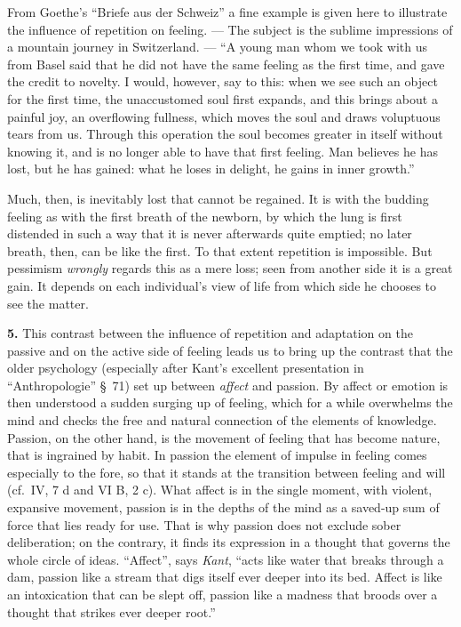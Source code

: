 \documentclass[12pt,a4paper]{book}
\newcommand{\opage}[1]{\marginnote{\footnotesize\textit{[#1]}}}
\begin{document}
From Goethe's ``Briefe aus der Schweiz'' a fine example is given here
to illustrate the influence of repetition on feeling. --- The subject is
the sublime impressions of a mountain journey in Switzerland. --- ``A
young man whom we took with us from Basel said that he did not have the
same feeling as the first time, and gave the credit to novelty. I would,
however, say to this: when we see such an object for the first time, the
unaccustomed soul first expands, and this brings about a painful joy, an
overflowing fullness, which moves the soul and draws voluptuous tears
from us. Through this operation the soul becomes greater in itself
without knowing it, and is no longer able to have that first feeling.
Man believes he has lost, but he has gained: what he loses in delight,
he gains in inner growth.''

Much, then, is inevitably lost that cannot be regained. It is with the
budding feeling as with the first breath of the newborn, by which the
lung is first distended in such a way that it is never afterwards quite
emptied; no later breath, then, can be like the first. To that extent
repetition is impossible. But pessimism \emph{wrongly} regards this as a
mere loss; seen from another side it is a great
\opage{334}gain. It depends on each individual's view of life from which
side he chooses to see the matter.

\textbf{5.} This contrast between the influence of repetition and
adaptation on the passive and on the active side of feeling leads us to
bring up the contrast that the older psychology (especially after
Kant's excellent presentation in ``Anthropologie'' \S~71) set up between
\emph{affect} and passion. By affect or emotion is then understood a
sudden surging up of feeling, which for a while overwhelms the mind and
checks the free and natural connection of the elements of knowledge.
Passion, on the other hand, is the movement of feeling that has become
nature, that is ingrained by habit. In passion the element of impulse in
feeling comes especially to the fore, so that it stands at the
transition between feeling and will (cf.\ IV, 7 d and VI B, 2 c). What
affect is in the single moment, with violent, expansive movement,
passion is in the depths of the mind as a saved-up sum of force that
lies ready for use. That is why passion does not exclude sober
deliberation; on the contrary, it finds its expression in a thought that
governs the whole circle of ideas. ``Affect'', says \emph{Kant}, ``acts
like water that breaks through a dam, passion like a stream that digs
itself ever deeper into its bed. Affect is like an intoxication that can
be slept off, passion like a madness that broods over a thought that
strikes ever deeper root.''
\end{document}
